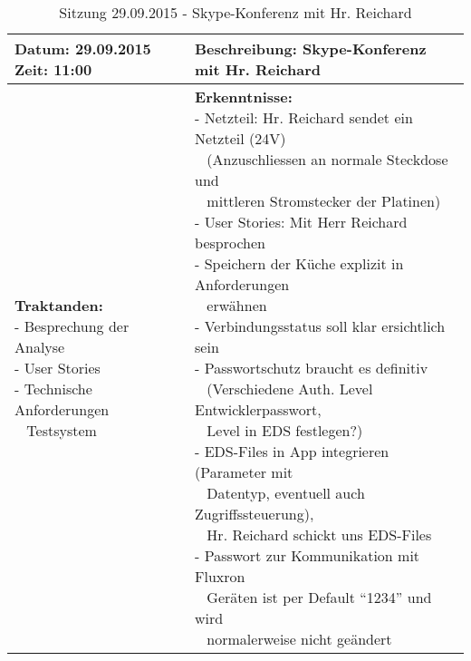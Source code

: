 \begin{table}[H]
\begin{tabularx}{\textwidth}{| l | X |}
\hline
\textbf{Datum:} 29.09.2015
\textbf{Zeit:} 11:00
&
\textbf{Beschreibung:} Skype-Konferenz mit Hr. Reichard \\ \hline
\specialcell[t]{
\textbf{Traktanden:}\\
- Besprechung der Analyse\\
- User Stories\\
- Technische Anforderungen\\~ Testsystem\\
}
& 
\specialcell[t]{
\textbf{Erkenntnisse:}\\
- Netzteil: Hr. Reichard sendet ein Netzteil (24V)\\~ (Anzuschliessen an normale Steckdose und\\~ mittleren Stromstecker der Platinen)\\
- User Stories: Mit Herr Reichard besprochen\\
- Speichern der Küche explizit in Anforderungen\\~ erwähnen\\
- Verbindungsstatus soll klar ersichtlich sein\\
- Passwortschutz braucht es definitiv\\~ (Verschiedene Auth. Level Entwicklerpasswort,\\~ Level in EDS festlegen?)\\
- EDS-Files in App integrieren (Parameter mit\\~ Datentyp, eventuell auch Zugriffssteuerung),\\~ Hr. Reichard schickt uns EDS-Files\\
- Passwort zur Kommunikation mit Fluxron\\~ Geräten ist per Default \enquote{1234} und wird\\~ normalerweise nicht geändert\\
}
\\ \hline
\end{tabularx}
\caption{Sitzung 29.09.2015 - Skype-Konferenz mit Hr. Reichard}
\end{table}



